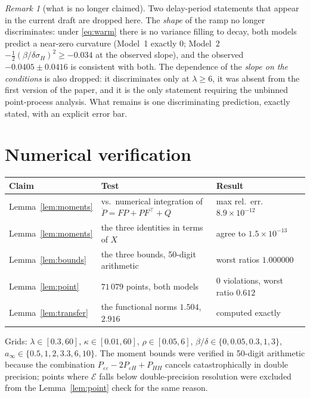 \documentclass[11pt,a4paper]{article}
\theoremstyle{remark}\newtheorem{remark}[proposition]{Remark}
\begin{document}
\begin{remark}[what is no longer claimed]
Two delay-period statements that appear in the current draft are dropped here. The
\emph{shape} of the ramp no longer discriminates: under \eqref{eq:warm} there is no
variance filling to decay, both models predict a near-zero curvature (Model~1 exactly
$0$; Model~2 $-\frac12(\beta/\delta\sigma_H)^{2}\ge-0.034$ at the observed slope), and
the observed $-0.0405\pm0.0416$ is consistent with both. The dependence of the
\emph{slope on the conditions} is also dropped: it discriminates only at
$\lambda\ge6$, it was absent from the first version of the paper, and it is the only
statement requiring the unbinned point-process analysis. What remains is one
discriminating prediction, exactly stated, with an explicit error bar.
\end{remark}

\section{Numerical verification}\label{sec:checks}

\begin{center}
\begin{tabular}{lll}
\toprule
Claim & Test & Result\\
\midrule
Lemma~\ref{lem:moments} & vs.\ numerical integration of $\dot P=FP+PF^{\!\top}+Q$ & max rel.\ err.\ $8.9\times10^{-12}$\\
Lemma~\ref{lem:moments} & the three identities in terms of $X$ & agree to $1.5\times10^{-13}$\\
Lemma~\ref{lem:bounds} & the three bounds, 50-digit arithmetic & worst ratios $1.000000$\\
Lemma~\ref{lem:point} & $71\,079$ points, both models & $0$ violations, worst ratio $0.612$\\
Lemma~\ref{lem:transfer} & the functional norms $1.504$, $2.916$ & computed exactly\\
\bottomrule
\end{tabular}
\end{center}

Grids: $\lambda\in[0.3,60]$, $\kappa\in[0.01,60]$, $\rho\in[0.05,6]$,
$\beta/\delta\in\{0,0.05,0.3,1,3\}$, $a_\infty\in\{0.5,1,2,3.3,6,10\}$. The moment
bounds were verified in 50-digit arithmetic because the combination
$P_{\varepsilon\varepsilon}-2P_{\varepsilon H}+P_{HH}$ cancels catastrophically in
double precision; points where $\mathcal{E}$ falls below double-precision resolution
were excluded from the Lemma~\ref{lem:point} check for the same reason.
\end{document}
